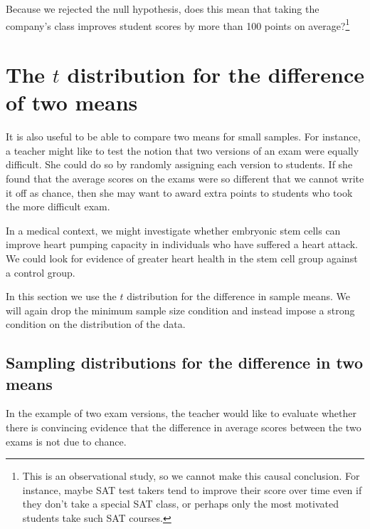 \begin{exercise}
Because we rejected the null hypothesis, does this mean that taking the company's class improves student scores by more than 100 points on average?\footnote{This is an observational study, so we cannot make this causal conclusion. For instance, maybe SAT test takers tend to improve their score over time even if they don't take a special SAT class, or perhaps only the most motivated students take such SAT courses.}


\end{exercise}


\section{The $t$ distribution for the difference of two means}
\label{theTDistributionForTheDifferenceOfTwoMeans}

It is also useful to be able to compare two means for small samples. For instance, a teacher might like to test the notion that two versions of an exam were equally difficult. She could do so by randomly assigning each version to students. If she found that the average scores on the exams were so different that we cannot write it off as chance, then she may want to award extra points to students who took the more difficult exam.

In a medical context, we might investigate whether embryonic stem cells can improve heart pumping capacity in individuals who have suffered a heart attack. We could look for evidence of greater heart health in the stem cell group against a control group.

In this section we use the $t$ distribution for the difference in sample means. We will again drop the minimum sample size condition and instead impose a strong condition on the distribution of the data.


\subsection{Sampling distributions for the difference in two means}

In the example of two exam versions, the teacher would like to evaluate whether there is convincing evidence that the difference in average scores between the two exams is not due to chance.

